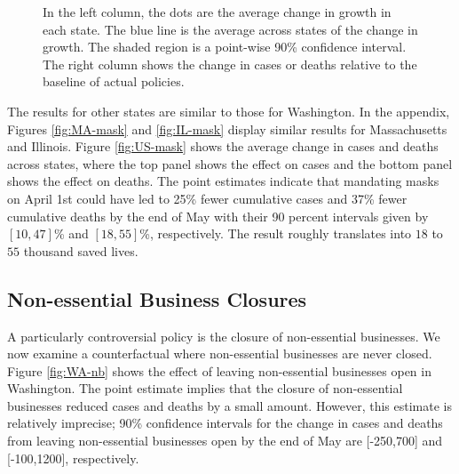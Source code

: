 \documentclass[11pt,reqno,letter]{amsart}
\theoremstyle{definition}
\begin{document}
\begin{figure}[ht]
\begin{minipage}{\linewidth}
\begin{tabular}{cc}
    \end{tabular}
  \end{minipage}
    \begin{flushleft}
      \footnotesize In the left column, the dots are the average
      change in growth in each state. The blue line is the average
      across states of the change in growth. The shaded region is a
      point-wise 90\% confidence interval. The right column shows the
      change in cases or deaths relative to the baseline of actual
      policies.
    \end{flushleft}
\end{figure}


The results for other states are similar to those for Washington. In
the appendix, Figures  \ref{fig:MA-mask} and \ref{fig:IL-mask} display
similar results for Massachusetts and Illinois.
Figure \ref{fig:US-mask} shows the average change in cases and
deaths across states, where the top panel shows the effect on cases and the bottom panel shows the effect on deaths.
The point estimates indicate that mandating masks on April 1st
could have led to 25\% fewer cumulative cases and 37\% fewer
cumulative deaths by the end of May with their 90 percent intervals given by $[10,47]$\% and $[18,55]$\%, respectively. The result roughly translates into $18$ to $55$ thousand saved lives.

\subsection{Non-essential Business Closures}

A particularly controversial policy is the closure of non-essential
businesses. We now examine a counterfactual where non-essential
businesses are never closed. Figure \ref{fig:WA-nb} shows the effect
of leaving non-essential businesses open in Washington. The point
estimate implies that the closure of non-essential businesses reduced cases and
deaths by a small amount. However, this estimate is relatively
imprecise; 90\% confidence intervals for the change in cases and deaths from
leaving non-essential businesses open by the end of May are [-250,700] and
[-100,1200], respectively.
\end{document}
